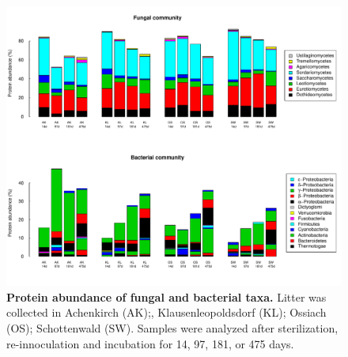 \documentclass[10pt]{article}
\begin{document}
\begin{flushleft}
\newpage
\begin{figure}[h!]
\vspace*{2mm}
\begin{center}
\includegraphics{ligpaper-metaprot2}
\end{center}
\caption{
{\bf Protein abundance of fungal and bacterial taxa.} Litter was collected in Achenkirch (AK);, Klausenleopoldsdorf (KL); Ossiach (OS); Schottenwald (SW). Samples were analyzed after sterilization, re-innoculation and incubation for 14, 97, 181, or 475 days.}
\end{figure}



\end{flushleft}
\end{document}
